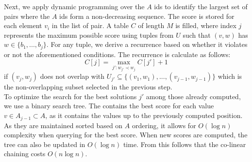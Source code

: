 Next, we apply dynamic programming over the $A$ ids to identify the largest set of pairs where the $A$ ids form a non-decreasing sequence. The score is stored for each element $v_i$ in the list of pair. A table $C$ of length $M$ is filled, where index $j$ represents the maximum possible score using tuples from $U$ such that $(v,w)$ has $w \in \{b_1,...,b_j\}$. For any tuple, we derive a recurrence based on whether it violates or not the aforementioned conditions. The recurrence is calculate as follows:
\begin{equation} 
C[j] = \max_{j':w_{j'} \prec w_j} C[j'] + 1
\end{equation}
if $(v_j,w_j)$ does not overlap with $ U_{j'} \subseteq \{(v_1,w_1),...,(v_{j-1},w_{j-1})\}$ which is the non-overlapping subset selected in the previous step.\\
To optimize the search for the best solutions $j'$ among those already computed, we use a binary search tree. The contains the best score for each value $v \in A_{j-1} \subset A$, as it contains the values up to the previously computed position. As they are maintained sorted based on $A$ ordering, it allows for $O(\log{n})$ complexity when querying for the best score. When new scores are computed, the tree can also be updated in $O(\log{n})$ time. From this follows that the co-linear chaining costs $O(n\log{n})$.


